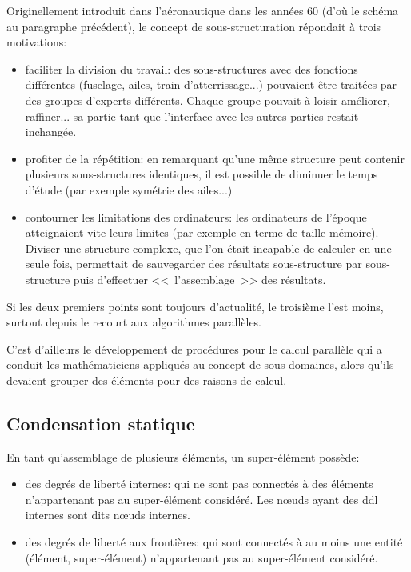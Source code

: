 \medskip
\begin{histoire}
Originellement introduit dans l'aéronautique dans les années 60 (d'où le schéma
au paragraphe précédent), le concept de sous-structuration
répondait à trois motivations:
\begin{itemize}
  \item faciliter la division du travail:
	des sous-structures avec des fonctions différentes (fuselage, ailes, train d'atterrissage...)
	pouvaient être traitées par des groupes d'experts différents. Chaque groupe pouvait
	à loisir améliorer, raffiner... sa partie tant que l'interface avec les autres parties
	restait inchangée.
  \item profiter de la répétition:
	en remarquant qu'une même structure peut contenir plusieurs sous-structures identiques,
	il est possible de diminuer le temps d'étude (par exemple symétrie des ailes...)
  \item contourner les limitations des ordinateurs:
	les ordinateurs de l'époque atteignaient vite leurs limites (par exemple en terme
	de taille mémoire). Diviser une structure complexe, que l'on était incapable de
	calculer en une seule fois, permettait de sauvegarder des résultats sous-structure
	par sous-structure puis d'effectuer <<~l'assemblage~>> des résultats.
\end{itemize}
Si les deux premiers points sont toujours d'actualité, le troisième l'est moins, surtout
depuis le recourt aux algorithmes parallèles.

C'est d'ailleurs le développement de procédures pour le calcul parallèle qui a conduit
les mathématiciens appliqués au concept de sous-domaines, alors qu'ils devaient grouper
des éléments pour des raisons de calcul.
\end{histoire}

\medskip
\subsection{Condensation statique}\label{Sec-condens}

En tant qu'assemblage de plusieurs éléments, un super-élément possède:
\begin{itemize}
  \item des degrés de liberté internes:
	qui ne sont pas connectés à des éléments n'appartenant pas au super-élément considéré.
	Les nœuds ayant des ddl internes sont dits nœuds internes.
  \item des degrés de liberté aux frontières:
	qui sont connectés à au moins une entité (élément, super-élément)
	n'appartenant pas au super-élément considéré.
\end{itemize}

